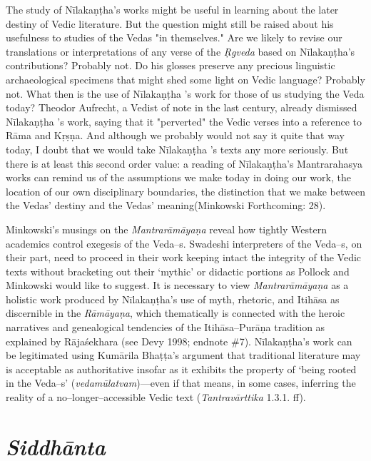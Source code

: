 \begin{myquote}
The study of Nīlakaṇṭha's works might be useful in learning about the later destiny of Vedic literature. But the question might still be raised about his usefulness to studies of the Vedas "in themselves." Are we likely to revise our translations or interpretations of any verse of the \textit{Ṛgveda} based on Nīlakaṇṭha's contributions? Probably not. Do his glosses preserve any precious linguistic archaeological specimens that might shed some light on Vedic language? Probably not. What then is the use of Nīlakaṇṭha 's work for those of us studying the Veda today? Theodor Aufrecht, a Vedist of note in the last century, already dismissed Nīlakaṇṭha 's work, saying that it "perverted" the Vedic verses into a reference to Rāma and Kṛṣṇa. And although we probably would not say it quite that way today, I doubt that we would take Nīlakaṇṭha 's texts any more seriously. But there is at least this second order value: a reading of Nīlakaṇṭha's Mantrarahasya works can remind us of the assumptions we make today in doing our work, the location of our own disciplinary boundaries, the distinction that we make between the Vedas' destiny and the Vedas' meaning\hfill (Minkowski Forthcoming: 28).
\end{myquote}

Minkowski’s musings on the \textit{Mantrarāmāyaṇa} reveal how tightly Western academics control exegesis of the Veda–s. Swadeshi interpreters of the Veda–s, on their part, need to proceed in their work keeping intact the integrity of the Vedic texts without bracketing out their ‘mythic’ or didactic portions as Pollock and Minkowski would like to suggest. It is necessary to view \textit{Mantrarāmāyaṇa} as a holistic work produced by Nīlakaṇṭha’s use of myth, rhetoric, and Itihāsa as discernible in the \textit{Rāmāyaṇa}, which thematically is connected with the heroic narratives and genealogical tendencies of the Itihāsa–Purāṇa tradition as explained by Rājaśekhara (see Devy 1998; endnote \#7). Nīlakaṇṭha’s work can be legitimated using Kumārila Bhaṭṭa’s argument that traditional literature may is acceptable as authoritative insofar as it exhibits the property of ‘being rooted in the Veda–s’ (\textit{vedamūlatvam})—even if that means, in some cases, inferring the reality of a no–longer–accessible Vedic text (\textit{Tantravārttika} 1.3.1. ff).


\section*{\textit{Siddhānta}}

